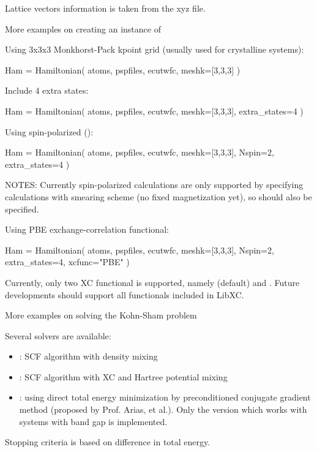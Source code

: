 Lattice vectors information is taken from the xyz file.

More examples on creating an instance of 

Using 3x3x3 Monkhorst-Pack kpoint grid (usually used for crystalline systems):
\begin{juliacode}
Ham = Hamiltonian( atoms, pspfiles, ecutwfc, meshk=[3,3,3] )    
\end{juliacode}

Include 4 extra states:
\begin{juliacode}
Ham = Hamiltonian( atoms, pspfiles, ecutwfc, meshk=[3,3,3], extra_states=4 )
\end{juliacode}

Using spin-polarized ():
\begin{juliacode}
Ham = Hamiltonian( atoms, pspfiles, ecutwfc, meshk=[3,3,3],
    Nspin=2, extra_states=4 )
\end{juliacode}

NOTES: Currently spin-polarized calculations are only supported by
specifying calculations with smearing scheme (no fixed magnetization yet),
so  should also be specified.

Using PBE exchange-correlation functional:
\begin{juliacode}
Ham = Hamiltonian( atoms, pspfiles, ecutwfc, meshk=[3,3,3],
    Nspin=2, extra_states=4, xcfunc="PBE" )
\end{juliacode}
Currently, only two XC functional is supported, namely 
(default) and .
Future developments should support all functionals included in LibXC.

More examples on solving the Kohn-Sham problem

Several solvers are available:
\begin{itemize}
\item {}: SCF algorithm with density mixing
\item {}: SCF algorithm with XC and Hartree potential mixing
\item {}: using direct total energy minimization by
preconditioned conjugate gradient method (proposed by Prof. Arias, et al.). Only
the version which works with systems with band gap is implemented.
\end{itemize}

Stopping criteria is based on difference in total energy.

